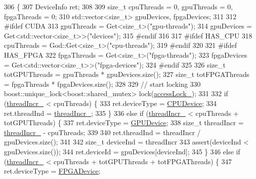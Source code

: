 \begin{DoxyCode}
306 \{
307   DeviceInfo ret;
308 
309   \textcolor{keywordtype}{size\_t} cpuThreads = 0, gpuThreads = 0, fpgaThreads = 0;
310   std::vector<size\_t> gpuDevices, fpgaDevices;
311 
312 \textcolor{preprocessor}{#ifdef CUDA}
313   gpuThreads = Get<size\_t>(\textcolor{stringliteral}{"gpu-threads"});
314   gpuDevices = Get<std::vector<size\_t>>(\textcolor{stringliteral}{"devices"});
315 \textcolor{preprocessor}{#endif}
316 
317 \textcolor{preprocessor}{#ifdef HAS\_CPU}
318   cpuThreads = God::Get<size\_t>(\textcolor{stringliteral}{"cpu-threads"});
319 \textcolor{preprocessor}{#endif}
320 
321 \textcolor{preprocessor}{#ifdef HAS\_FPGA}
322   fpgaThreads = Get<size\_t>(\textcolor{stringliteral}{"fpga-threads"});
323   fpgaDevices = Get<std::vector<size\_t>>(\textcolor{stringliteral}{"fpga-devices"});
324 \textcolor{preprocessor}{#endif}
325 
326   \textcolor{keywordtype}{size\_t} totGPUThreads = gpuThreads * gpuDevices.size();
327   \textcolor{keywordtype}{size\_t} totFPGAThreads = fpgaThreads * fpgaDevices.size();
328 
329   \textcolor{comment}{// start locking}
330   boost::unique\_lock<boost::shared\_mutex> lock(\hyperlink{classamunmt_1_1God_afcd5629990403f8b2b16d9bd08db238e}{accessLock\_});
331 
332   \textcolor{keywordflow}{if} (\hyperlink{classamunmt_1_1God_a900c7443532f035640b4ff064899b50e}{threadIncr\_} < cpuThreads) \{
333     ret.deviceType = \hyperlink{namespaceamunmt_a0f0dad0deb73c5a4c574d8c63833ab17aafe1036ae66e30a8f082bda43072162a}{CPUDevice};
334     ret.threadInd = \hyperlink{classamunmt_1_1God_a900c7443532f035640b4ff064899b50e}{threadIncr\_};
335   \}
336   \textcolor{keywordflow}{else} \textcolor{keywordflow}{if} (\hyperlink{classamunmt_1_1God_a900c7443532f035640b4ff064899b50e}{threadIncr\_} < cpuThreads + totGPUThreads) \{
337     ret.deviceType = \hyperlink{namespaceamunmt_a0f0dad0deb73c5a4c574d8c63833ab17a2ff3f7952956ae21ddcfa3564fe4de5f}{GPUDevice};
338     \textcolor{keywordtype}{size\_t} threadIncr = \hyperlink{classamunmt_1_1God_a900c7443532f035640b4ff064899b50e}{threadIncr\_} - cpuThreads;
339 
340     ret.threadInd = threadIncr / gpuDevices.size();
341 
342     \textcolor{keywordtype}{size\_t} deviceInd = threadIncr %
343     assert(deviceInd < gpuDevices.size());
344     ret.deviceId = gpuDevices[deviceInd];
345   \}
346   \textcolor{keywordflow}{else} \textcolor{keywordflow}{if} (\hyperlink{classamunmt_1_1God_a900c7443532f035640b4ff064899b50e}{threadIncr\_} < cpuThreads + totGPUThreads + totFPGAThreads) \{
347     ret.deviceType = \hyperlink{namespaceamunmt_a0f0dad0deb73c5a4c574d8c63833ab17a1fd21d75952419f8b1ab988f28f747fc}{FPGADevice};

\end{DoxyCode}
